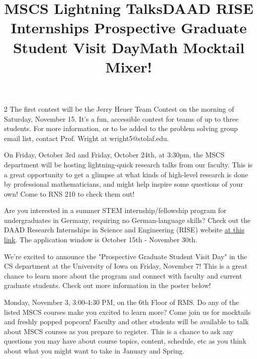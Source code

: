 \documentclass[12pt]{article}
\newcommand{\bolder}{\textbf}
\begin{document}
\begin{multicols}{2}
The first contest will be the Jerry Heuer Team Contest on the morning of Saturday, November 15. It's a fun, accessible contest for teams of up to three students. For more information, or to be added to the problem solving group email list, contact Prof. Wright at wright5@stolaf.edu.


\begin{tcolorbox}[colback=white, colframe=black]
    \begin{center}
    \title{{\large \bolder{MSCS Lightning Talks}}}
    \end{center}
\end{tcolorbox}

On Friday, October 3rd and Friday, October 24th, at 3:30pm, the MSCS department will be hosting lightning-quick research talks from our faculty. This is a great opportunity to get a glimpse at what kinds of high-level research is done by professional mathematicians, and might help inspire some questions of your own! Come to RNS 210 to check them out!



\begin{tcolorbox}[colback=white, colframe=black]
    \begin{center}
    \title{{\large \bolder{DAAD RISE Internships}}}
    \end{center}
\end{tcolorbox}

Are you interested in a summer STEM internship/fellowship program for undergraduates in Germany, requiring no German-language skills? Check out the DAAD Research Internships in Science and Engineering (RISE) website \href{https://www.daad.de/rise/en/}{at this link}. The application window is October 15th - November 30th.


 \begin{tcolorbox}[colback=white, colframe=black]
    \begin{center}
    \title{{\large \bolder{ Prospective Graduate Student Visit Day}}}
    \end{center}
\end{tcolorbox}
We’re excited to announce the "Prospective Graduate Student Visit Day" in the CS department at the University of Iowa on Friday, November 7! This is a great chance to learn more about the program and connect with faculty and current graduate students. Check out more information in the poster below!


 \begin{tcolorbox}[colback=white, colframe=black]
    \begin{center}
    \title{{\large \bolder{Math Mocktail Mixer!}}}
    \end{center}
\end{tcolorbox}
Monday, November 3, 3:00-4:30 PM, on the 6th Floor of RMS. Do any of the listed MSCS courses make you excited to learn more? Come join us for mocktails and freshly popped popcorn! Faculty and other students will be available to talk about MSCS courses as you prepare to register. This is a chance to ask any questions you may have about course topics, content, schedule, etc as you think about what you might want to take in January and Spring.


\end{multicols}
\end{document}
